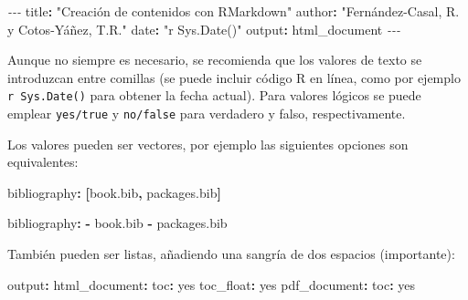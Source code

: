 \documentclass[
]{book}
\newenvironment{Shaded}{\begin{snugshade}}{\end{snugshade}}
\newcommand{\AttributeTok}[1]{\textcolor[rgb]{0.77,0.63,0.00}{#1}}
\newcommand{\CharTok}[1]{\textcolor[rgb]{0.31,0.60,0.02}{#1}}
\newcommand{\FunctionTok}[1]{\textcolor[rgb]{0.00,0.00,0.00}{#1}}
\newcommand{\KeywordTok}[1]{\textcolor[rgb]{0.13,0.29,0.53}{\textbf{#1}}}
\newcommand{\PreprocessorTok}[1]{\textcolor[rgb]{0.56,0.35,0.01}{\textit{#1}}}
\newcommand{\StringTok}[1]{\textcolor[rgb]{0.31,0.60,0.02}{#1}}
\theoremstyle{definition}
\theoremstyle{definition}
\theoremstyle{definition}
\theoremstyle{definition}
\theoremstyle{remark}
\begin{document}
\begin{Shaded}
\begin{Highlighting}[]
\PreprocessorTok{{-}{-}{-}}
\FunctionTok{title}\KeywordTok{:}\AttributeTok{ }\StringTok{"Creación de contenidos con RMarkdown"}
\FunctionTok{author}\KeywordTok{:}\AttributeTok{ }\StringTok{"Fernández{-}Casal, R. y Cotos{-}Yáñez, T.R."}
\FunctionTok{date}\KeywordTok{:}\AttributeTok{ }\StringTok{"\textasciigrave{}r Sys.Date()\textasciigrave{}"}
\FunctionTok{output}\KeywordTok{:}\AttributeTok{ html\_document}
\PreprocessorTok{{-}{-}{-}}
\end{Highlighting}
\end{Shaded}

Aunque no siempre es necesario, se recomienda que los valores de texto se introduzcan entre comillas (se puede incluir código R en línea, como por ejemplo \texttt{\textasciigrave{}r\ Sys.Date()\textasciigrave{}} para obtener la fecha actual). Para valores lógicos se puede emplear \texttt{yes/true} y \texttt{no/false} para verdadero y falso, respectivamente.

Los valores pueden ser vectores, por ejemplo las siguientes opciones son equivalentes:

\begin{Shaded}
\begin{Highlighting}[]
\FunctionTok{bibliography}\KeywordTok{:}\AttributeTok{ }\KeywordTok{[}\AttributeTok{book.bib}\KeywordTok{,}\AttributeTok{ packages.bib}\KeywordTok{]}
\end{Highlighting}
\end{Shaded}

\begin{Shaded}
\begin{Highlighting}[]
\FunctionTok{bibliography}\KeywordTok{:}
\KeywordTok{{-}}\AttributeTok{ book.bib}
\KeywordTok{{-}}\AttributeTok{ packages.bib}
\end{Highlighting}
\end{Shaded}

También pueden ser listas, añadiendo una sangría de dos espacios (importante):

\begin{Shaded}
\begin{Highlighting}[]
\FunctionTok{output}\KeywordTok{:}
\AttributeTok{  }\FunctionTok{html\_document}\KeywordTok{:}
\AttributeTok{    }\FunctionTok{toc}\KeywordTok{:}\AttributeTok{ }\CharTok{yes}
\AttributeTok{    }\FunctionTok{toc\_float}\KeywordTok{:}\AttributeTok{ }\CharTok{yes}
\AttributeTok{  }\FunctionTok{pdf\_document}\KeywordTok{:}
\AttributeTok{    }\FunctionTok{toc}\KeywordTok{:}\AttributeTok{ }\CharTok{yes}
\end{Highlighting}
\end{Shaded}
\end{document}
